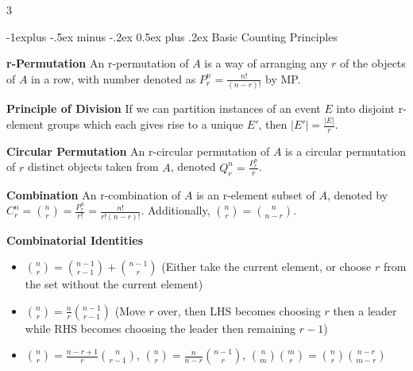 \documentclass[10pt, landscape]{article}
\makeatletter
\renewcommand{\section}{\@startsection{section}{1}{0mm}%
                                {-1ex plus -.5ex minus -.2ex}%
                                {0.5ex plus .2ex}%
                                {\normalfont\large\bfseries}}
\renewcommand{\section}{\@startsection{section}{2}{0mm}%
                                {-1explus -.5ex minus -.2ex}%
                                {0.5ex plus .2ex}%
                                {\normalfont\normalsize\bfseries}}
\makeatother
\begin{document}
\raggedright
\footnotesize
\begin{multicols*}{3}

\setlength{\columnseprule}{0.25pt}
\setlength{\premulticols}{1pt}
\setlength{\postmulticols}{1pt}
\setlength{\multicolsep}{1pt}
\setlength{\columnsep}{2pt}

\begin{center}
\end{center}

\section{Basic Counting Principles}

\textbf{r-Permutation} An r-permutation of $A$ is a way of arranging any $r$ of the objects of $A$ in a row, with number denoted as $P_r^n=\frac{n!}{(n-r)!}$ by MP.

\textbf{Principle of Division} If we can partition instances of an event $E$ into disjoint r-element groups which each gives rise to a unique $E'$, then $|E'|=\frac{|E|}{r}$.

\textbf{Circular Permutation} An r-circular permutation of $A$ is a circular permutation of $r$ distinct objects taken from $A$, denoted $Q_r^n=\frac{P_r^n}{r}$.

\textbf{Combination} An r-combination of $A$ is an r-element subset of $A$, denoted by $C_r^n={n \choose r}=\frac{P_r^n}{r!}=\frac{n!}{r!(n-r)!}$. Additionally, ${n \choose r}={n \choose n-r}$.

\textbf{Combinatorial Identities}
\begin{itemize}
    \item ${n \choose r} = {n-1 \choose r-1}+{n-1 \choose r}$ (Either take the current element, or choose $r$ from the set without the current element)
    \item ${n \choose r} = \frac{n}{r}{n-1 \choose r-1}$ (Move $r$ over, then LHS becomes choosing $r$ then a leader while RHS becomes choosing the leader then remaining $r-1$)
    \item ${n \choose r} = \frac{n-r+1}{r}{n \choose r-1}$, ${n \choose r}=\frac{n}{n-r}{n-1 \choose r}$, ${n \choose m}{m \choose r}={n \choose r}{n-r \choose m-r}$
\end{itemize}


\end{multicols*}
\end{document}
